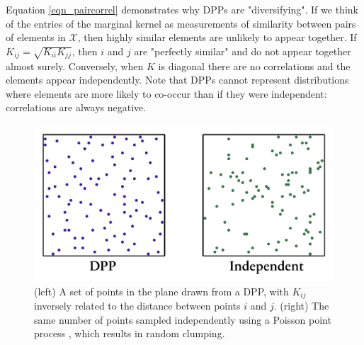 Equation \ref{eqn_paircorrel} demonstrates why DPPs are "diversifying". If we think of the entries of the marginal kernel as measurements of similarity between pairs of elements in $\mathcal{X}$, then highly similar elements are unlikely to appear together. If $K_{i j}=\sqrt{K_{i i} K_{j j}}$, then $i$ and $j$ are "perfectly similar" and do not appear together almost surely. Conversely, when $K$ is diagonal there are no correlations and the elements appear independently. Note that DPPs cannot represent distributions where elements are more likely to co-occur than if they were independent: correlations are always negative.
\begin{figure}[!h]
    \centering
    \includegraphics[width=0.6\linewidth]{pics/dpp_vs_iid.png}
    \caption{(left) A set of points in the plane drawn from a DPP, with $K_{i j}$ inversely related to the distance between points $i$ and $j$. (right) The same number of points sampled independently using a Poisson point process , which results in random clumping.}
    \label{fig_dpp_vs_iid}
\end{figure}


\vspace{10cm}
